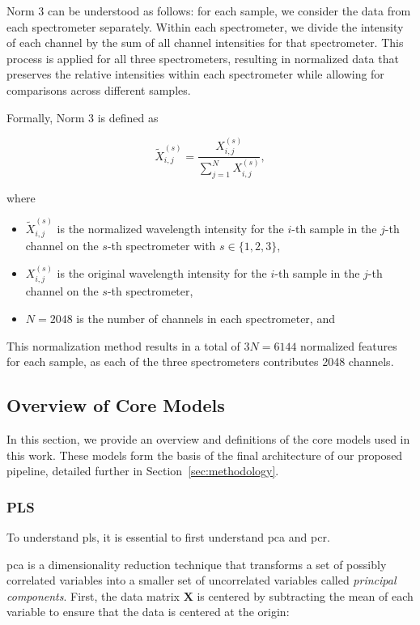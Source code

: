 Norm 3 can be understood as follows: for each sample, we consider the data from each spectrometer separately. Within each spectrometer, we divide the intensity of each channel by the sum of all channel intensities for that spectrometer. This process is applied for all three spectrometers, resulting in normalized data that preserves the relative intensities within each spectrometer while allowing for comparisons across different samples.

Formally, Norm 3 is defined as

\begin{equation}
	\tilde{X}_{i,j}^{(s)} = \frac{X_{i,j}^{(s)}}{\sum_{j=1}^{N} X_{i,j}^{(s)}},
\end{equation}

where

\begin{itemize}
	\item $\tilde{X}_{i,j}^{(s)}$ is the normalized wavelength intensity for the $i$-th sample in the $j$-th channel on the $s$-th spectrometer with $s \in \{1, 2, 3\}$,
	\item $X_{i,j}^{(s)}$ is the original wavelength intensity for the $i$-th sample in the $j$-th channel on the $s$-th spectrometer,
	\item $N = 2048$ is the number of channels in each spectrometer, and
\end{itemize}

This normalization method results in a total of $3N = 6144$ normalized features for each sample, as each of the three spectrometers contributes 2048 channels.

\subsection{Overview of Core Models}
In this section, we provide an overview and definitions of the core models used in this work.
These models form the basis of the final architecture of our proposed pipeline, detailed further in Section~\ref{sec:methodology}.

\subsubsection{PLS}
To understand \gls{pls}, it is essential to first understand \gls{pca} and \gls{pcr}.

\gls{pca} is a dimensionality reduction technique that transforms a set of possibly correlated variables into a smaller set of uncorrelated variables called \textit{principal components}.
First, the data matrix $\mathbf{X}$ is centered by subtracting the mean of each variable to ensure that the data is centered at the origin:


